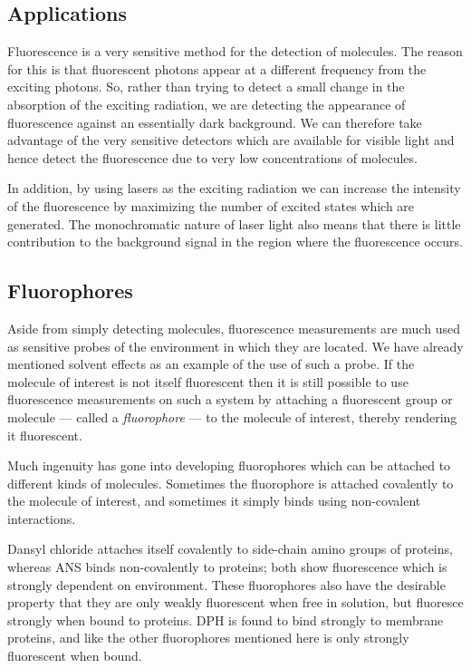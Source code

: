 \documentclass{article}
\theoremstyle{plain}\theoremheaderfont{\normalfont\itshape}\theorembodyfont{\rmfamily}\theoremseparator{.}\newtheorem*{rem}{Remark}\newtheorem*{ex}{Example}\newtheorem*{proof}{Proof}\newtheorem*{altp}{Alternative proof}
\theoremstyle{plain}\theoremheaderfont{\normalfont\bfseries}\theorembodyfont{\rmfamily}\theoremseparator{.}\newtheorem{thm}{Theorem}[section]\newtheorem{lem}[thm]{Lemma}\newtheorem{prop}[thm]{Proposition}\newtheorem*{cor}{Corollary}\newtheorem{defn}[thm]{Definition}\newtheorem{clm}[thm]{Claim}\newtheorem{clminproof}{Claim}\newtheorem{pos}{Postulate}[section]
\theoremstyle{break}\theoremheaderfont{\normalfont\itshape}\theorembodyfont{\rmfamily}\theoremseparator{.\medskip}\newtheorem*{proofskip}{Proof}\newtheorem*{exs}{Examples}\newtheorem*{rems}{Remarks}
\theoremstyle{break}\theoremheaderfont{\normalfont\bfseries}\theorembodyfont{\rmfamily}\theoremseparator{.\medskip}\newtheorem{lemskip}[thm]{Lemma}\newtheorem{defnskip}[thm]{Definition}\newtheorem{propskip}[thm]{Proposition}\newtheorem{thmskip}[thm]{Theorem}
\numberwithin{equation}{section}
\begin{document}
    \subsection{Applications}
    Fluorescence is a very sensitive method for the detection of molecules. The reason for this is that fluorescent photons appear at a different frequency from the exciting photons. So, rather than trying to detect a small change in the absorption of the exciting radiation, we are detecting the appearance of fluorescence against an essentially dark background. We can therefore take advantage of the very sensitive detectors which are available for visible light and hence detect the fluorescence due to very low concentrations of molecules.

    In addition, by using lasers as the exciting radiation we can increase the intensity of the fluorescence by maximizing the number of excited states which are generated. The monochromatic nature of laser light also means that there is little contribution to the background signal in the region where the fluorescence occurs.

    \subsection{Fluorophores}
    Aside from simply detecting molecules, fluorescence measurements are much used as sensitive probes of the environment in which they are located. We have already mentioned solvent effects as an example of the use of such a probe. If the molecule of interest is not itself fluorescent then it is still possible to use fluorescence measurements on such a system by attaching a fluorescent group or molecule --- called a \textit{fluorophore} --- to the molecule of interest, thereby rendering it fluorescent.

    Much ingenuity has gone into developing fluorophores which can be attached to different kinds of molecules. Sometimes the fluorophore is attached covalently to the molecule of interest, and sometimes it simply binds using non-covalent interactions.

    Dansyl chloride attaches itself covalently to side-chain amino groups of proteins, whereas ANS binds non-covalently to proteins; both show fluorescence which is strongly dependent on environment. These fluorophores also have the desirable property that they are only weakly fluorescent when free in solution, but fluoresce strongly when bound to proteins. DPH is found to bind strongly to membrane proteins, and like the other fluorophores mentioned here is only strongly fluorescent when bound.
\end{document}
